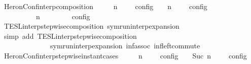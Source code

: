\begin{isabellebody}
\isanewline
{}\isamarkupfalse%
\ HeronConf{\isacharunderscore}interp{\isacharunderscore}composition{\isacharcolon}\isanewline
\ \ \ {\isacartoucheopen}{\isasymlbrakk}\ {\isasymGamma}\ n\ {\isasymturnstile}\ {\isasymPsi}\ {\isasymtriangleright}\ {\isasymPhi}\ {\isasymrbrakk}\isactrlsub c\isactrlsub o\isactrlsub n\isactrlsub f\isactrlsub i\isactrlsub g\ {\isasyminter}\ {\isasymlbrakk}\ {\isasymGamma}\ n\ {\isasymturnstile}\ {\isasymPsi}\ {\isasymtriangleright}\ {\isasymPhi}\ {\isasymrbrakk}\isactrlsub c\isactrlsub o\isactrlsub n\isactrlsub f\isactrlsub i\isactrlsub g\isanewline
\ \ \ \ \ {\isacharequal}\ {\isasymlbrakk}\ {\isacharparenleft}{\isasymGamma}\ {\isacharat}\ {\isasymGamma}\ n\ {\isasymturnstile}\ {\isacharparenleft}{\isasymPsi}\ {\isacharat}\ {\isasymPsi}\ {\isasymtriangleright}\ {\isacharparenleft}{\isasymPhi}\ {\isacharat}\ {\isasymPhi}\ {\isasymrbrakk}\isactrlsub c\isactrlsub o\isactrlsub n\isactrlsub f\isactrlsub i\isactrlsub g{\isacartoucheclose}\isanewline
%
\isadelimproof
\ \ %
\endisadelimproof
%
\isatagproof
{}\isamarkupfalse%
\ TESL{\isacharunderscore}interp{\isacharunderscore}stepwise{\isacharunderscore}composition\ symrun{\isacharunderscore}interp{\isacharunderscore}expansion\isanewline
{}\isamarkupfalse%
\ {\isacharparenleft}simp\ add{\isacharcolon}\ TESL{\isacharunderscore}interp{\isacharunderscore}stepwise{\isacharunderscore}composition\isanewline
\ \ \ \ \ \ \ \ \ \ \ \ \ \ symrun{\isacharunderscore}interp{\isacharunderscore}expansion\ inf{\isacharunderscore}assoc\ inf{\isacharunderscore}left{\isacharunderscore}commute{\isacharparenright}%
\endisatagproof
{\isafoldproof}%
%
\isadelimproof
\isanewline
%
\endisadelimproof
\isanewline
{}\isamarkupfalse%
\ HeronConf{\isacharunderscore}interp{\isacharunderscore}stepwise{\isacharunderscore}instant{\isacharunderscore}cases{\isacharcolon}\isanewline
\ \ \ {\isacartoucheopen}{\isasymlbrakk}\ {\isasymGamma}{\isacharcomma}\ n\ {\isasymturnstile}\ {\isacharbrackleft}{\isacharbrackright}\ {\isasymtriangleright}\ {\isasymPhi}\ {\isasymrbrakk}\isactrlsub c\isactrlsub o\isactrlsub n\isactrlsub f\isactrlsub i\isactrlsub g\ {\isacharequal}\ {\isasymlbrakk}\ {\isasymGamma}{\isacharcomma}\ Suc\ n\ {\isasymturnstile}\ {\isasymPhi}\ {\isasymtriangleright}\ {\isacharbrackleft}{\isacharbrackright}\ {\isasymrbrakk}\isactrlsub c\isactrlsub o\isactrlsub n\isactrlsub f\isactrlsub i\isactrlsub g{\isacartoucheclose}\isanewline

\end{isabellebody}

